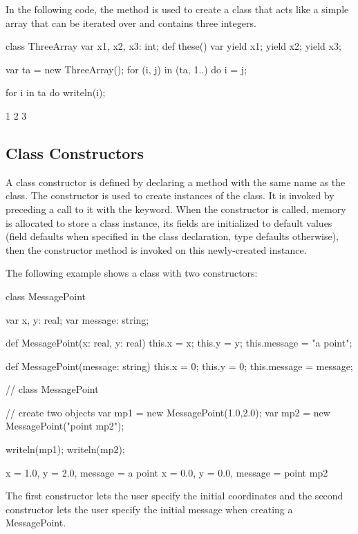 \begin{example}
In the following code, the  method is used to create a
class that acts like a simple array that can be iterated over and
contains three integers.
\begin{chapelpre}
\end{chapelpre}
\begin{chapel}
class ThreeArray {
  var x1, x2, x3: int;
  def these() var {
    yield x1;
    yield x2;
    yield x3;
  }
}
\end{chapel}
\begin{chapelpost}
var ta = new ThreeArray();
for (i, j) in (ta, 1..) do
  i = j;

for i in ta do
  writeln(i);
\end{chapelpost}
\begin{chapeloutput}
1
2
3
\end{chapeloutput}

\end{example}

\subsection{Class Constructors}
\label{Class_Constructors}

A class constructor is defined by declaring a method with the same
name as the class.  The constructor is used to create instances of the
class. It is invoked by preceding a call to it with the 
keyword.  When the constructor is called, memory is allocated to store
a class instance, its fields are initialized to default values
(field defaults when specified in the class declaration, type defaults
otherwise), then the constructor method is invoked on this newly-created
instance.

\begin{example}
The following example shows a class with two constructors:
\begin{chapelpre}
\end{chapelpre}
\begin{chapel}
class MessagePoint {
  var x, y: real;
  var message: string;

  def MessagePoint(x: real, y: real) {
    this.x = x;
    this.y = y;
    this.message = "a point";
  }

  def MessagePoint(message: string) {
    this.x = 0;
    this.y = 0;
    this.message = message;
  }
}  // class MessagePoint

// create two objects
var mp1 = new MessagePoint(1.0,2.0);
var mp2 = new MessagePoint("point mp2");
\end{chapel}
\begin{chapelpost}
writeln(mp1);
writeln(mp2);
\end{chapelpost}
\begin{chapeloutput}
{x = 1.0, y = 2.0, message = a point}
{x = 0.0, y = 0.0, message = point mp2}
\end{chapeloutput}
The first constructor lets the user specify the initial coordinates
and the second constructor lets the user specify the initial message
when creating a MessagePoint.
\end{example}

